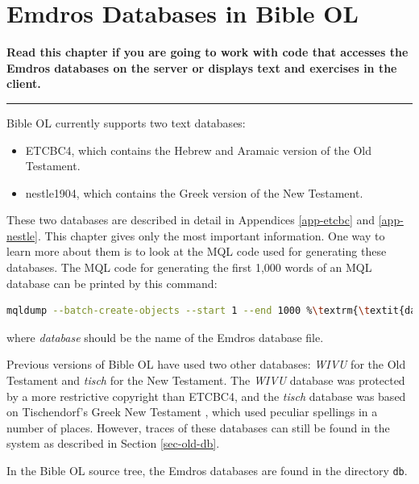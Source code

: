 \documentclass[11pt,oneside,a4paper]{memoir}
\begin{document}
\chapter{Emdros Databases in Bible OL}

\textbf{Read this chapter if you are going to work with code that accesses the Emdros databases on
  the server or displays text and exercises in the client.}
\plainbreak{3}

Bible OL currently supports two text databases:

\begin{itemize}
\item ETCBC4, which contains the Hebrew and Aramaic version of the Old
  Testament.
\item nestle1904, which contains the Greek version of the New Testament.
\end{itemize}

These two databases are described in detail in Appendices \ref{app-etcbc} and
\ref{app-nestle}. This chapter gives only the most important information.
One way to learn more about them is to look at the MQL code used for generating these databases. The
MQL code for generating the first 1,000 words of an MQL database can be printed by this command:

\begin{lstlisting}[language=bash]
mqldump --batch-create-objects --start 1 --end 1000 %\textrm{\textit{database}}\label{list-mqldump}\index{mqldump}%
\end{lstlisting}

\noindent
where \emph{database} should be the name of the Emdros database file.

Previous versions of Bible OL have used two other databases: \emph{WIVU} for the Old Testament and
\emph{tisch} for the New Testament. The \emph{WIVU} database was protected by a more restrictive
copyright than ETCBC4, and the \emph{tisch} database was based on Tischendorf's Greek New Testament%
,
which used peculiar spellings in a number of places. However, traces of these databases can still be
found in the system as described in Section \ref{sec-old-db}.

In the Bible OL source tree, the Emdros databases are found in the directory \texttt{db}.
\end{document}
